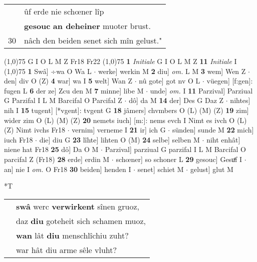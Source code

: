 \documentclass[8pt,a4paper,notitlepage]{article}
\begin{document}
\begin{table}[ht]
\begin{minipage}[t]{0.5\linewidth}
\begin{tabular}{rl}
 & ûf erde nie schœner lîp\\ 
 & \textbf{gesouc} \textbf{an deheiner} muoter brust.\\ 
30 & nâch den beiden senet sich mîn gelust."\\ 
\end{tabular}
\scriptsize
\line(1,0){75} \newline
G I O L M Z Fr18 Fr22 \newline
\line(1,0){75} \newline
\textbf{1} \textit{Initiale} G I O L M Z  \textbf{11} \textit{Initiale} I  \newline
\line(1,0){75} \newline
\textbf{1} Swâ] ÷wa O Wa L  $\cdot$ werke] werkin M \textbf{2} diu] \textit{om.} L M \textbf{3} wem] Wen Z  $\cdot$ den] div O (Z) \textbf{4} war] wa I \textbf{5} welt] Wan Z  $\cdot$ nû gote] got nv O L  $\cdot$ vüegen] [f:gen]: fugen L \textbf{6} der ze] Zcu den M \textbf{7} minne] libe M  $\cdot$ unde] \textit{om.} I \textbf{11} Parzival] Parziual G Parzifal I L M Barcifal O Parcifal Z  $\cdot$ dô] da M \textbf{14} der] Des G Daz Z  $\cdot$ nihtes] nih I \textbf{15} tugent] [*vgent]: tvgent G \textbf{18} jâmers] chvmbers O (L) (M) (Z) \textbf{19} zim] wider zim O (L) (M) (Z) \textbf{20} nemets iuch] [m:]: nems evch I Nimt es ivch O (L) (Z) Nimt ivchs Fr18  $\cdot$ vernim] verneme I \textbf{21} ir] ich G  $\cdot$ sünden] sunde M \textbf{22} mich] iuch Fr18  $\cdot$ die] diu G \textbf{23} lîhte] lihten O (M) \textbf{24} selbe] selben M  $\cdot$ niht enhât] niene hat Fr18 \textbf{25} dô] Da O M  $\cdot$ Parzival] parziual G parzifal I L M Barcifal O parcifal Z (Fr18) \textbf{28} erde] erdin M  $\cdot$ schœner] so schoner L \textbf{29} gesouc] Gesuͤf I  $\cdot$ an] nie I \textit{om.} O Fr18 \textbf{30} beiden] henden I  $\cdot$ senet] schiet M  $\cdot$ gelust] glut M \newline
\end{minipage}
\hspace{0.5cm}
\begin{minipage}[t]{0.5\linewidth}
\small
\begin{center}*T
\end{center}
\begin{tabular}{rl}
 & \textbf{swâ} werc \textbf{verwirkent} sînen gruoz,\\ 
 & daz \textbf{diu} goteheit sich schamen muoz,\\ 
 & \textbf{wan} lât \textbf{diu} menschlîchiu zuht?\\ 
 & war hât diu arme sêle vluht?\\ 

\end{tabular}
\end{minipage}
\end{table}
\end{document}
